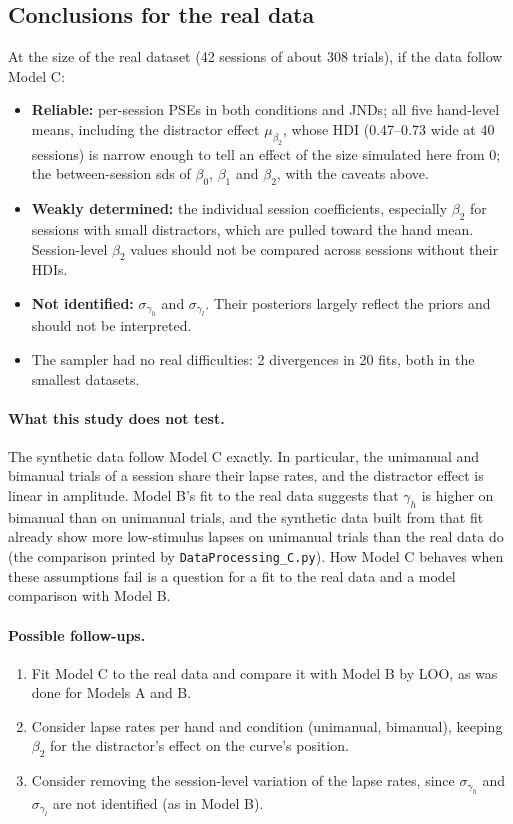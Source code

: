 \documentclass[11pt]{article}
\newcommand{\code}[1]{\texttt{#1}}
\begin{document}
\subsection{Conclusions for the real data}

At the size of the real dataset (42 sessions of about 308 trials), if the data follow
Model C:

\begin{itemize}
  \item \textbf{Reliable:} per-session PSEs in both conditions and JNDs; all five
        hand-level means, including the distractor effect $\mu_{\beta_2}$, whose HDI
        (0.47--0.73 wide at 40 sessions) is narrow enough to tell an effect of the
        size simulated here from 0; the between-session sds of $\beta_0$, $\beta_1$
        and $\beta_2$, with the caveats above.
  \item \textbf{Weakly determined:} the individual session coefficients, especially
        $\beta_2$ for sessions with small distractors, which are pulled toward the hand
        mean. Session-level $\beta_2$ values should not be compared across sessions
        without their HDIs.
  \item \textbf{Not identified:} $\sigma_{\gamma_h}$ and $\sigma_{\gamma_l}$. Their
        posteriors largely reflect the priors and should not be interpreted.
  \item The sampler had no real difficulties: 2 divergences in 20 fits, both in the
        smallest datasets.
\end{itemize}

\paragraph{What this study does not test.} The synthetic data follow Model C
exactly. In particular, the unimanual and bimanual trials of a session share their
lapse rates, and the distractor effect is linear in amplitude. Model B's fit to the
real data suggests that $\gamma_h$ is higher on bimanual than on unimanual trials, and
the synthetic data built from that fit already show more low-stimulus lapses on
unimanual trials than the real data do (the comparison printed by
\code{DataProcessing\_C.py}). How Model C behaves when these assumptions
fail is a question for a fit to the real data and a model comparison with Model B.

\paragraph{Possible follow-ups.}
\begin{enumerate}
  \item Fit Model C to the real data and compare it with Model B by LOO, as was done
        for Models A and B.
  \item Consider lapse rates per hand and condition (unimanual, bimanual), keeping
        $\beta_2$ for the distractor's effect on the curve's position.
  \item Consider removing the session-level variation of the lapse rates, since
        $\sigma_{\gamma_h}$ and $\sigma_{\gamma_l}$ are not identified (as in Model B).
\end{enumerate}
\end{document}
